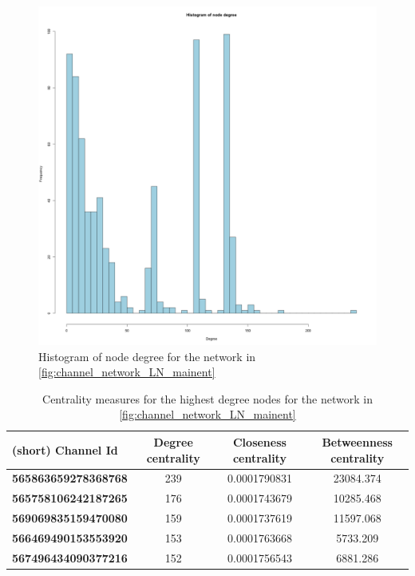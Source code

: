 \begin{figure}[ht]
    \centering
    \includegraphics[width=17cm]{figures/graphs/histogram_ln_mainnet_run1.png}
    \caption{Histogram of node degree for the network in \cref{fig:channel_network_LN_mainent}}
    \label{fig:histogram}
\end{figure}

\begin{table}[ht]
\centering
\caption{Centrality measures for the highest degree nodes for the network in \cref{fig:channel_network_LN_mainent}}
\label{centrality_table}
\begin{tabular}{l|c|c|c}
 \textbf{(short) Channel Id}     & \textbf{Degree centrality} & \textbf{Closeness centrality} & \textbf{Betweenness centrality} \\ \hline
\textbf{565863659278368768} &  239 & 0.0001790831 &  23084.374         \\ \hline
\textbf{565758106242187265} &  176 & 0.0001743679 &  10285.468            \\ \hline
\textbf{569069835159470080} &  159 & 0.0001737619 &  11597.068                                 \\ \hline
\textbf{566469490153553920} &  153 & 0.0001763668 &  5733.209                               \\ \hline
\textbf{567496434090377216} &  152 & 0.0001756543 &  6881.286                               \\ \hline
\end{tabular}
\end{table}

